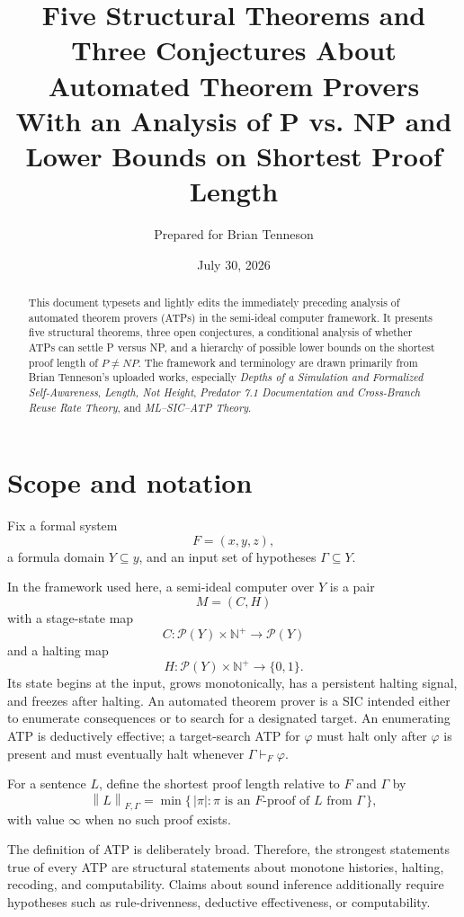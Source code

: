 \documentclass[11pt,letterpaper]{article}
\title{Five Structural Theorems and Three Conjectures About Automated Theorem Provers\\[0.4em]
\large With an Analysis of P vs. NP and Lower Bounds on Shortest Proof Length}
\author{Prepared for Brian Tenneson}
\date{July 30, 2026}
\theoremstyle{named}
\newcommand{\prooflen}[2]{\left\lVert #1\right\rVert_{#2}}
\begin{document}
\maketitle

\begin{abstract}
This document typesets and lightly edits the immediately preceding analysis of automated theorem provers (ATPs) in the semi-ideal computer framework. It presents five structural theorems, three open conjectures, a conditional analysis of whether ATPs can settle P versus NP, and a hierarchy of possible lower bounds on the shortest proof length of $P\ne NP$. The framework and terminology are drawn primarily from Brian Tenneson's uploaded works, especially \emph{Depths of a Simulation and Formalized Self-Awareness}, \emph{Length, Not Height}, \emph{Predator 7.1 Documentation and Cross-Branch Reuse Rate Theory}, and \emph{ML--SIC--ATP Theory}.
\end{abstract}

\tableofcontents
\newpage

\section{Scope and notation}

Fix a formal system
\[
F=(x,y,z),
\]
a formula domain $Y\subseteq y$, and an input set of hypotheses $\Gamma\subseteq Y$.

In the framework used here, a semi-ideal computer over $Y$ is a pair
\[
M=(C,H)
\]
with a stage-state map
\[
C:\mathcal P(Y)\times\mathbb N^+\longrightarrow\mathcal P(Y)
\]
and a halting map
\[
H:\mathcal P(Y)\times\mathbb N^+\longrightarrow\{0,1\}.
\]
Its state begins at the input, grows monotonically, has a persistent halting signal, and freezes after halting. An automated theorem prover is a SIC intended either to enumerate consequences or to search for a designated target. An enumerating ATP is deductively effective; a target-search ATP for $\varphi$ must halt only after $\varphi$ is present and must eventually halt whenever $\Gamma\vdash_F\varphi$.

For a sentence $L$, define the shortest proof length relative to $F$ and $\Gamma$ by
\[
\prooflen{L}{F,\Gamma}
=
\min\{\,|\pi|:\pi\text{ is an }F\text{-proof of }L\text{ from }\Gamma\,\},
\]
with value $\infty$ when no such proof exists.

The definition of ATP is deliberately broad. Therefore, the strongest statements true of every ATP are structural statements about monotone histories, halting, recoding, and computability. Claims about sound inference additionally require hypotheses such as rule-drivenness, deductive effectiveness, or computability.
\end{document}

